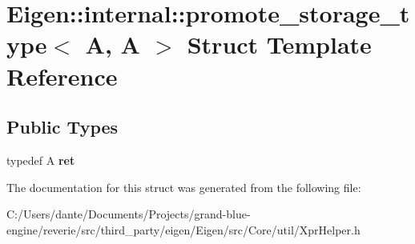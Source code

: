 \hypertarget{struct_eigen_1_1internal_1_1promote__storage__type_3_01_a_00_01_a_01_4}{}\section{Eigen\+::internal\+::promote\+\_\+storage\+\_\+type$<$ A, A $>$ Struct Template Reference}
\label{struct_eigen_1_1internal_1_1promote__storage__type_3_01_a_00_01_a_01_4}
\subsection*{Public Types}
\begin{DoxyCompactItemize}
\item 
\mbox{\label{struct_eigen_1_1internal_1_1promote__storage__type_3_01_a_00_01_a_01_4_ab091df47078e366a85a513704ae9c415}} 
typedef A {\bfseries ret}
\end{DoxyCompactItemize}


The documentation for this struct was generated from the following file\+:\begin{DoxyCompactItemize}
\item 
C\+:/\+Users/dante/\+Documents/\+Projects/grand-\/blue-\/engine/reverie/src/third\+\_\+party/eigen/\+Eigen/src/\+Core/util/Xpr\+Helper.\+h\end{DoxyCompactItemize}
